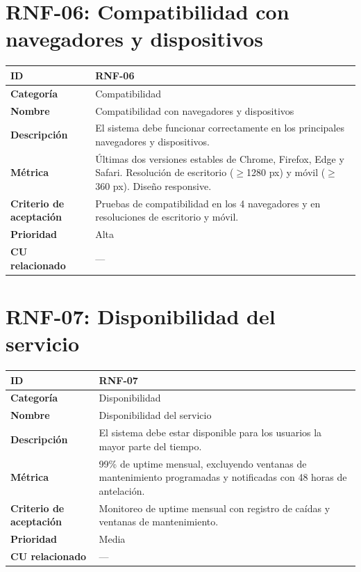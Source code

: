 \documentclass{article}
\begin{document}
\section*{RNF-06: Compatibilidad con navegadores y dispositivos}
\begin{center}
\renewcommand{\arraystretch}{1.4}
\begin{tabular}{|L{4cm}|L{12cm}|}
\hline
\textbf{ID} & RNF-06 \\
\hline
\textbf{Categoría} & Compatibilidad \\
\hline
\textbf{Nombre} & Compatibilidad con navegadores y dispositivos \\
\hline
\textbf{Descripción} & El sistema debe funcionar correctamente en los principales navegadores y dispositivos. \\
\hline
\textbf{Métrica} & Últimas dos versiones estables de Chrome, Firefox, Edge y Safari. Resolución de escritorio ($\geq$1280 px) y móvil ($\geq$360 px). Diseño responsive. \\
\hline
\textbf{Criterio de aceptación} & Pruebas de compatibilidad en los 4 navegadores y en resoluciones de escritorio y móvil. \\
\hline
\textbf{Prioridad} & Alta \\
\hline
\textbf{CU relacionado} & --- \\
\hline
\end{tabular}
\end{center}

\section*{RNF-07: Disponibilidad del servicio}
\begin{center}
\renewcommand{\arraystretch}{1.4}
\begin{tabular}{|L{4cm}|L{12cm}|}
\hline
\textbf{ID} & RNF-07 \\
\hline
\textbf{Categoría} & Disponibilidad \\
\hline
\textbf{Nombre} & Disponibilidad del servicio \\
\hline
\textbf{Descripción} & El sistema debe estar disponible para los usuarios la mayor parte del tiempo. \\
\hline
\textbf{Métrica} & 99\% de uptime mensual, excluyendo ventanas de mantenimiento programadas y notificadas con 48 horas de antelación. \\
\hline
\textbf{Criterio de aceptación} & Monitoreo de uptime mensual con registro de caídas y ventanas de mantenimiento. \\
\hline
\textbf{Prioridad} & Media \\
\hline
\textbf{CU relacionado} & --- \\
\hline
\end{tabular}
\end{center}
\end{document}
